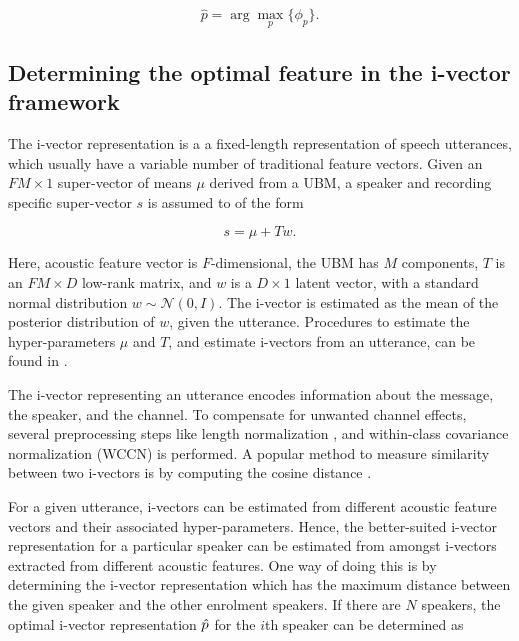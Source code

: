 \documentclass{article}
\begin{document}
\begin{equation}
\hat{p} = \arg\max_p \{\phi_p\}.
\label{eq:ubm_optFeat}
\end{equation}

\subsection{Determining the optimal feature in the i-vector framework}
\label{subsec:ivec_optFeat}

The i-vector representation \cite{dehak_ivector} is a a fixed-length
representation of speech utterances, which usually have a variable number of
traditional feature vectors.  Given an $FM \times 1$ super-vector of means $\mu$
derived from a UBM, a speaker and recording specific super-vector $s$ is assumed to of
the form

\begin{equation}
s = \mu + T w.
\end{equation}

Here, acoustic feature vector is $F$-dimensional, the UBM has $M$ components,
$T$ is an $FM \times D$ low-rank matrix, and $w$ is a $D \times 1$ latent
vector, with a standard normal distribution $w \sim \mathcal{N}(0,I)$. The
i-vector is estimated as the mean of the posterior distribution of $w$, given
the utterance. Procedures to estimate the hyper-parameters $\mu$ and $T$, and 
estimate i-vectors from an utterance, can be found in \cite{dehak_ivector}.

The i-vector representing an utterance encodes information about the message,
the speaker, and the channel. To compensate for unwanted channel effects,
several preprocessing steps like length normalization \cite{garcia_lengthNorm},
and within-class covariance normalization (WCCN) \cite{wccn} is performed. A
popular method to measure similarity between two i-vectors is by computing the
cosine distance \cite{dehak_ivector}.

For a given utterance, i-vectors can be estimated from different acoustic
feature vectors and their associated hyper-parameters. Hence, the
better-suited i-vector representation for a particular speaker can be estimated
from amongst i-vectors extracted from different acoustic features. One way of
doing this is by determining the i-vector representation which has the maximum
distance between the given speaker and the other enrolment speakers. If there
are $N$ speakers, the optimal i-vector representation $\Hat{p}$ 
for the $i$th speaker can be determined as
\end{document}
